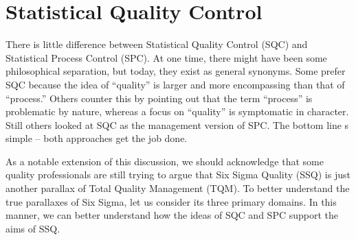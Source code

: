 \documentclass[]{report}
\begin{document}
%
%



\section{Statistical Quality Control}
There is little difference between Statistical Quality Control (SQC) and Statistical Process Control (SPC).  At one time, there might have been some philosophical separation, but today, they exist as general synonyms.  Some prefer SQC because the idea of “quality” is larger and more encompassing than that of “process.”  Others counter this by pointing out that the term “process” is problematic by nature, whereas a focus on “quality” is symptomatic in character.  Still others looked at SQC as the management version of SPC.  The bottom line s simple – both approaches get the job done.

As a notable extension of this discussion, we should acknowledge that some quality professionals are still trying to argue that Six Sigma Quality (SSQ) is just another parallax of Total Quality Management (TQM).  To better understand the true parallaxes of Six Sigma, let us consider its three primary domains.  In this manner, we can better understand how the ideas of SQC and SPC support the aims of SSQ.
\end{document}
